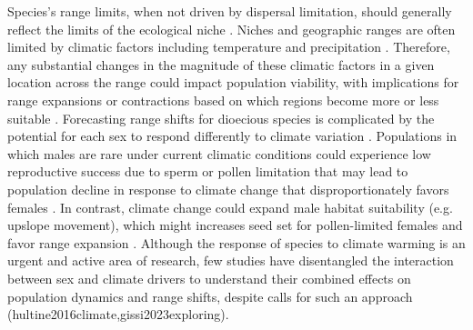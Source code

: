 \documentclass[12pt]{article}\usepackage[]{graphicx}\usepackage[dvipsnames]{xcolor}
\begin{document}
Species's range limits, when not driven by dispersal limitation, should generally reflect the limits of the ecological niche \citep{lee2016synthesis}.
Niches and geographic ranges are often limited by climatic factors including temperature and precipitation \citep{sexton2009evolution}. 
Therefore, any substantial changes in the magnitude of these climatic factors in a given location across the range could impact population viability, with implications for range expansions or contractions based on which regions become more or less suitable  \citep{davis2001range, pease1989model}. 
Forecasting range shifts for dioecious species is complicated by the potential for each sex to respond differently to climate variation \citep{pottier2021sexual,hultine2016climate,morrison2016causes}.
Populations in which males are rare under current climatic conditions could experience low reproductive success due to sperm or pollen limitation that may lead to population decline in response to climate change that disproportionately favors females \citep{eberhart2017sex}.
In contrast, climate change could expand male habitat suitability (e.g. upslope movement), which might increases seed set for pollen-limited females and favor range expansion \citep{petry2016sex}.
Although the response of species to climate warming is an urgent and active area of research, few studies have disentangled the interaction between sex and climate drivers to understand their combined effects on population dynamics and range shifts, despite calls for such an approach (hultine2016climate,gissi2023exploring).  
\end{document}
